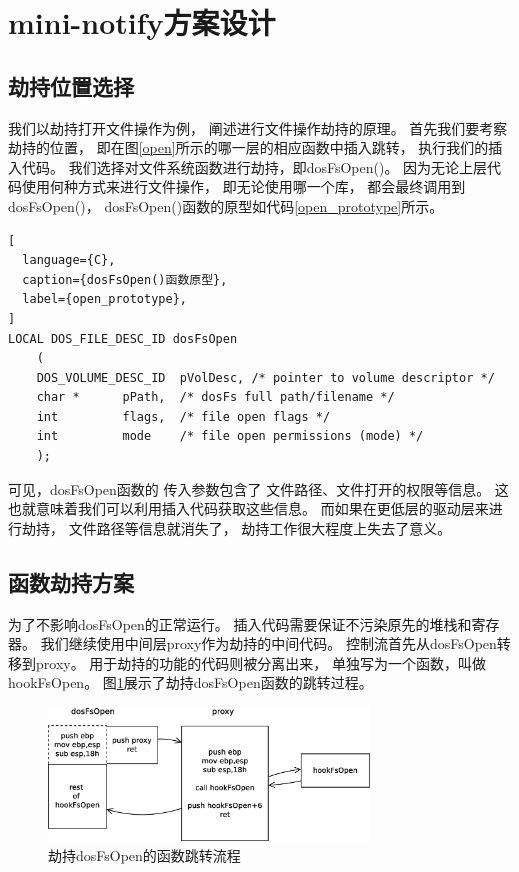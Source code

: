 \section{mini-notify方案设计}

\subsection{劫持位置选择}

我们以劫持打开文件操作为例，
阐述进行文件操作劫持的原理。
首先我们要考察劫持的位置，
即在图\ref{open}所示的哪一层的相应函数中插入跳转，
执行我们的插入代码。
我们选择对文件系统函数进行劫持，即dosFsOpen()。
因为无论上层代码使用何种方式来进行文件操作，
即无论使用哪一个库，
都会最终调用到dosFsOpen()，
dosFsOpen()函数的原型如代码\ref{open_prototype}所示。


\begin{lstlisting}[
  language={C},
  caption={dosFsOpen()函数原型},
  label={open_prototype},
]
LOCAL DOS_FILE_DESC_ID dosFsOpen
    (
    DOS_VOLUME_DESC_ID  pVolDesc, /* pointer to volume descriptor */
    char *      pPath,  /* dosFs full path/filename */
    int         flags,  /* file open flags */
    int         mode    /* file open permissions (mode) */
    );
\end{lstlisting}

可见，dosFsOpen函数的
传入参数包含了
文件路径、文件打开的权限等信息。
这也就意味着我们可以利用插入代码获取这些信息。
而如果在更低层的驱动层来进行劫持，
文件路径等信息就消失了，
劫持工作很大程度上失去了意义。

\subsection{函数劫持方案}

为了不影响dosFsOpen的正常运行。
插入代码需要保证不污染原先的堆栈和寄存器。
我们继续使用中间层proxy作为劫持的中间代码。
控制流首先从dosFsOpen转移到proxy。
用于劫持的功能的代码则被分离出来，
单独写为一个函数，叫做hookFsOpen。
图\ref{proxy}展示了劫持dosFsOpen函数的跳转过程。

\begin{figure}[h!]
    \centering
    \includegraphics[width=0.76\textwidth]{figure/proxy.eps}
    \caption{劫持dosFsOpen的函数跳转流程}
    \label{proxy}
\end{figure}

